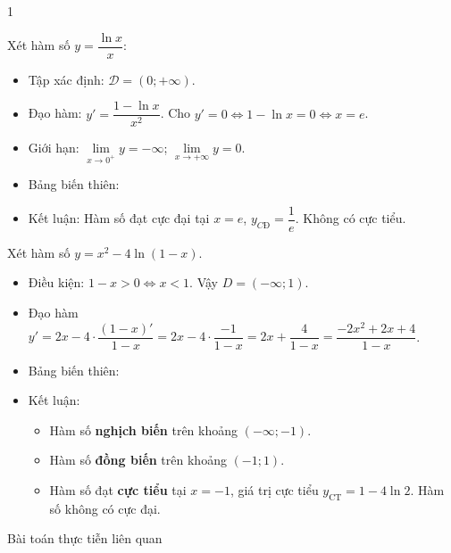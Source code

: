 \begin{vd}
{\begin{enumEX}[a)]{1}
\begin{itemize}
			\end{itemize}
			\item Xét hàm số $y = \dfrac{\ln x}{x}$:
			\begin{itemize}
				\item Tập xác định: $\mathscr{D} = (0; +\infty)$.
				\item Đạo hàm: $y' = \dfrac{1 - \ln x}{x^2}$. Cho $y' = 0 \Leftrightarrow 1 - \ln x = 0 \Leftrightarrow x = e$.
				\item Giới hạn: $\lim\limits_{x \to 0^+} y = -\infty$; $\lim\limits_{x \to +\infty} y = 0$.
				\item Bảng biến thiên:
				\begin{center}
				\end{center}
				\item Kết luận: Hàm số đạt cực đại tại $x = e$, $y_{CĐ} = \dfrac{1}{e}$. Không có cực tiểu.
			\end{itemize}
			
			\item Xét hàm số $y = x^2 - 4\ln(1 - x)$.
			\begin{itemize}
				\item Điều kiện: $1 - x > 0 \Leftrightarrow x < 1$. 
				Vậy $D = (-\infty; 1)$.
				\item Đạo hàm $y' = 2x - 4 \cdot \dfrac{(1 - x)'}{1 - x} = 2x - 4 \cdot \dfrac{-1}{1 - x} = 2x + \dfrac{4}{1 - x}=\dfrac{-2x^2 + 2x + 4}{1 - x}$.
				\item Bảng biến thiên:
				\begin{center}
				\end{center}
				\item Kết luận:
				\begin{itemize}
					\item Hàm số \textbf{nghịch biến} trên khoảng $(-\infty; -1)$.
					\item Hàm số \textbf{đồng biến} trên khoảng $(-1; 1)$.
					\item Hàm số đạt \textbf{cực tiểu} tại $x = -1$, giá trị cực tiểu $y_{\text{CT}} = 1 - 4\ln 2$. Hàm số không có cực đại.
				\end{itemize}
			\end{itemize}
		\end{enumEX}
	}
\end{vd}
\begin{dang}{Bài toán thực tiễn liên quan}
	
\end{dang}

